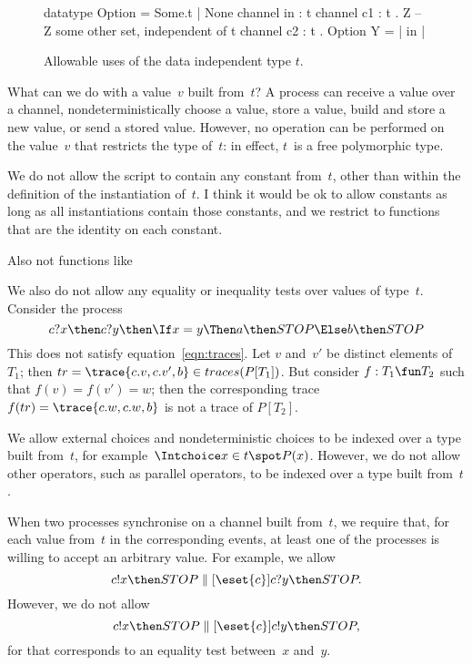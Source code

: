 
\begin{figure}[h]
\begin{cspm}
datatype Option = Some.t | None
channel in : t
channel c1 : t . Z -- Z some other set, independent of t
channel c2 : t . Option
Y = {| in |}
\end{cspm}
\caption{Allowable uses of the data independent type $t$. \label{fig:t-allowed}}
\end{figure}


What can we do with a value~$v$ built from~$t$?  A process can receive a value
over a channel, nondeterministically choose a value, store a value, build and
store a new value, or send a stored value.  However, no operation can be
performed on the value~$v$ that restricts the type of~$t$: in effect, $t$~is a
free polymorphic type.

We do not allow the script to contain any constant from~$t$, other than within
the definition of the instantiation of~$t$.  \framebox{**} I
think it would be ok to allow constants as long as all instantiations contain
those constants, and we restrict to functions that are the identity on each
constant. 

Also not functions like  \framebox{\ldots}

We also do not allow any equality or inequality tests over values of type~$t$.
Consider the process
\[
c?x \then c?y \then \If x = y \Then a \then STOP \Else b \then STOP
\]
%
This does not satisfy equation~\ref{eqn:traces}.  Let $v$ and~$v'$ be distinct
elements of~$T_1$; then $tr = \trace{c.v, c.v', b} \in traces(P[T_1])$.  But
consider $f: T_1 \fun T_2$ such that $f(v) = f(v') = w$; then the
corresponding trace $f(tr) = \trace{c.w, c.w, b}$ is not a trace of
$P[T_2]$.

We allow external choices and nondeterministic choices to be indexed over a
type built from~$t$, for example~$\Intchoice x \in t \spot P(x)$.  However, we
do not allow other operators, such as parallel operators, to be indexed over a
type built from~$t$. 

When two processes synchronise on a channel built from~$t$, we require that,
for each value from~$t$ in the corresponding events, at least one of the
processes is willing to accept an arbitrary value.  For example, we allow
\[
c!x \then STOP \parallel[\eset{c}] c?y \then STOP.
\]
However, we do not allow 
\[
c!x \then STOP \parallel[\eset{c}] c!y \then STOP,
\]
for that corresponds to an equality test between~$x$ and~$y$. 


